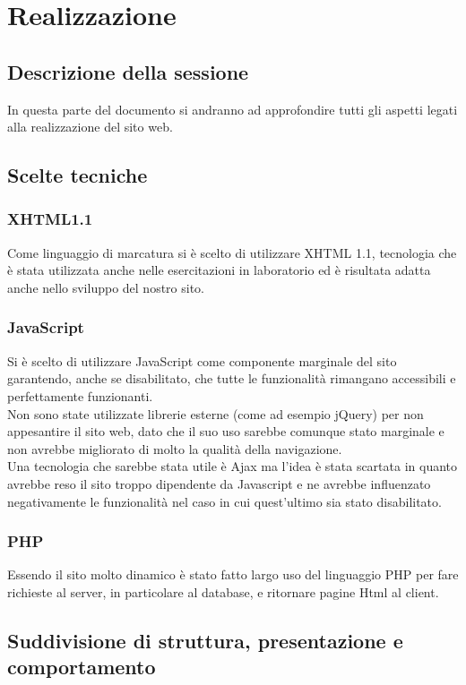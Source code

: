 \documentclass[openany, a4paper, 12pt]{report}
\begin{document}
	\chapter{Realizzazione}
		\section{Descrizione della sessione}
		In questa parte del documento si andranno ad approfondire tutti gli aspetti legati alla realizzazione del sito web.

	\section{Scelte tecniche}
		\subsection{XHTML1.1}
		Come linguaggio di marcatura si è scelto di utilizzare XHTML 1.1, tecnologia che è stata utilizzata anche nelle esercitazioni in laboratorio ed è risultata adatta anche nello sviluppo del nostro sito.\\
		
		\subsection{JavaScript}
		Si è scelto di utilizzare JavaScript come componente marginale del sito garantendo, anche se disabilitato, che tutte le funzionalità rimangano accessibili e perfettamente funzionanti.\\
		Non sono state utilizzate librerie esterne (come ad esempio jQuery) per non appesantire il sito web, dato che il suo uso sarebbe comunque stato marginale e non avrebbe migliorato di molto la qualità della navigazione.\\
		Una tecnologia che sarebbe stata utile è Ajax ma l'idea è stata scartata in quanto avrebbe reso il sito troppo dipendente da Javascript e ne avrebbe influenzato negativamente le funzionalità nel caso in cui quest'ultimo sia stato disabilitato.
		
		\subsection{PHP}
		Essendo il sito molto dinamico è stato fatto largo uso del linguaggio PHP per fare richieste al server, in particolare al database, e ritornare pagine Html al client.

	\section{Suddivisione di struttura, presentazione e comportamento}
\end{document}

